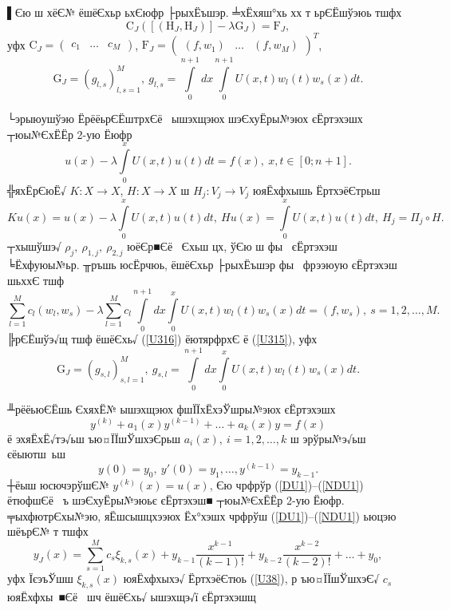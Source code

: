 \documentclass[12pt, a4paper, oneside]{article}
\begin{document}
▌Єю ш хёЄ№ ёшёЄхьр ьхЄюфр ├рыхЁъшэр. ╧хЁхяш°хь хх т ьрЄЁшўэюь тшфх
\begin{equation}\label{U315}
\mathrm{C}_J\left([(\mathrm{H}_J,\mathrm{H}_J)]-\lambda\mathrm{G}_J\right)=\mathrm{F}_J,
\end{equation}
уфх $\mathrm{C}_J=\begin{pmatrix}c_1&\dots &c_M\end{pmatrix}$, $\mathrm{F}_J=\begin{pmatrix}(f,w_1)&\dots &(f,w_M)\end{pmatrix}^T$,
\[
\mathrm{G}_J=(g_{l,s})_{l,s=1}^M,~g_{l,s}= \int\limits_{0}^{n+1}dx\int\limits_{0}^{n+1}U(x,t)w_l(t)w_s(x)dt.
\]
\par └эрыюушўэю ЁрёёьрЄЁштрхЄё  ышэхщэюх шэЄхуЁры№эюх єЁртэхэшх ┬юы№ЄхЁЁр 2-ую Ёюфр
\[
u(x)-\lambda\int\limits_{0}^{x}U(x,t)u(t)dt =f(x),~x,t\in [0;n+1].
\]
╬яхЁрЄюЁ√ $K:X\to X$, $H:X\to X$ ш $H_j : V_j\to V_j$ юяЁхфхышь ЁртхэёЄтрьш
\[
Ku(x)=u(x)-\lambda\int\limits_0^{x} U(x,t)u(t)dt,~Hu(x)=\int\limits_0^{x} U(x,t)u(t)dt,~H_j=\Pi_j\circ H.
\]
┬хышўшэ√ $\rho_j,~\rho_{1,j},~\rho_{2,j}$ юёЄр■Єё  Єхьш цх, ўЄю ш фы  єЁртэхэш  ╘Ёхфуюы№ьр.  ╥ръшь юсЁрчюь,
ёшёЄхьр ├рыхЁъшэр фы  фрээюую єЁртэхэш  шьххЄ тшф
\begin{equation}\label{U316}
\sum\limits_{l=1}^{M} c_l (w_l,w_s)-\lambda\sum\limits_{l=1}^{M} c_l \int\limits_{0}^{n+1}dx\int\limits_{0}^{x}U(x,t)w_l(t)w_s(x)dt =(f,w_s),~s=1,2,\dots,M.
\end{equation}
╠рЄЁшўэ√щ тшф ёшёЄхь√ (\ref{U316}) ёютярфрхЄ ё (\ref{U315}), уфх
\[
\mathrm{G}_J=(g_{s,l})_{s,l=1}^M,~g_{s,l}= \int\limits_{0}^{n+1}dx\int\limits_{0}^{x}U(x,t)w_l(t)w_s(x)dt.
\]
\par ╨рёёьюЄЁшь ЄхяхЁ№ ышэхщэюх фшЇЇхЁхэЎшры№эюх єЁртэхэшх
\begin{equation}\label{DU1}
y^{(k)}+a_1(x)y^{(k-1)}+\dots +a_k(x)y=f(x)
\end{equation}
ё эхяЁхЁ√тэ√ьш ъю¤ЇЇшЎшхэЄрьш $a_i(x),~i=1,2,\dots,k$ ш эрўры№э√ьш єёыютш ьш
\begin{equation}\label{NDU1}
y(0)=y_0,~y'(0)=y_1,\dots,y^{(k-1)}=y_{k-1}.
\end{equation}
┼ёыш юсючэрўшЄ№ $y^{(k)}(x)=u(x)$, Єю чрфрўр (\ref{DU1})--(\ref{NDU1}) ётюфшЄё  ъ  шэЄхуЁры№эюьє єЁртэхэш■ ┬юы№ЄхЁЁр 2-ую Ёюфр. ╤ыхфютрЄхы№эю, яЁшсышцхээюх Ёх°хэшх чрфрўш (\ref{DU1})--(\ref{NDU1}) ьюцэю шёърЄ№ т тшфх
\[y_J(x)=\sum\limits_{s=1}^M c_s {\xi}_{k,s}(x) +y_{k-1}\frac{x^{k-1}}{(k-1)!}+y_{k-2}\frac{x^{k-2}}{(k-2)!}+\dots+y_0,\]
уфх ЇєэъЎшш ${\xi}_{k,s}(x)$ юяЁхфхыхэ√ ЁртхэёЄтюь (\ref{U38}), р ъю¤ЇЇшЎшхэЄ√ $c_s$ юяЁхфхы ■Єё  шч ёшёЄхь√ ышэхщэ√ї єЁртэхэшщ
\end{document}

